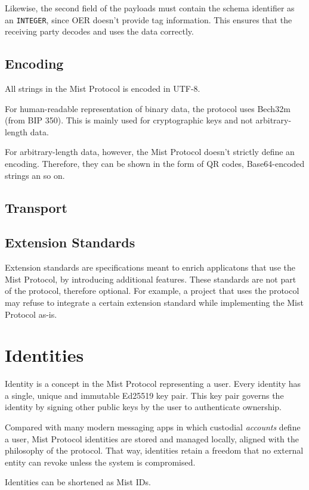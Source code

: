 \documentclass{article}
\begin{document}
Likewise, the second field of the payloads must contain the schema identifier as an \verb|INTEGER|, since OER doesn't provide tag information. This ensures that the receiving party decodes and uses the data correctly.

\subsection{Encoding}
All strings in the Mist Protocol is encoded in UTF-8.

For human-readable representation of binary data, the protocol uses Bech32m (from BIP 350). This is mainly used for cryptographic keys and not arbitrary-length data.

For arbitrary-length data, however, the Mist Protocol doesn't strictly define an encoding. Therefore, they can be shown in the form of QR codes, Base64-encoded strings an so on.

\subsection{Transport}

\subsection{Extension Standards}
Extension standards are specifications meant to enrich applicatons that use the Mist Protocol, by introducing additional features. These standards are not part of the protocol, therefore optional. For example, a project that uses the protocol may refuse to integrate a certain extension standard while implementing the Mist Protocol as-is.


\section{Identities}
Identity is a concept in the Mist Protocol representing a user. Every identity has a single, unique and immutable Ed25519 key pair. This key pair governs the identity by signing other public keys by the user to authenticate ownership.

Compared with many modern messaging apps in which custodial \textit{accounts} define a user, Mist Protocol identities are stored and managed locally, aligned with the philosophy of the protocol. That way, identities retain a freedom that no external entity can revoke unless the system is compromised.

Identities can be shortened as Mist IDs.
\end{document}
